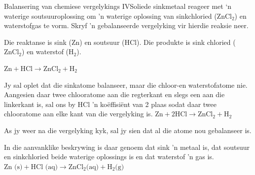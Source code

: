       \noindent
\begin{wex}{Balansering van chemiese vergelykings IV}{Soliede sinkmetaal reageer met ‘n waterige soutsuuroplossing om 'n waterige oplossing van  sinkchloried ($\text{ZnCl}_{2}$) en waterstofgas te vorm. Skryf 'n gebalanseerde vergelyking vir hierdie reaksie neer.}

{
Die reaktanse is sink ($\text{Zn}$) en soutsuur ($\text{HCl}$). Die produkte is sink chloried ($\text{ZnCl}_{2}$) en waterstof ($\text{H}_{2}$).\\
}

{
${\text{Zn} + \text{HCl} \rightarrow \text{ZnCl}_{2} + \text{H}_{2}}$
}

{
Jy sal oplet dat die sinkatome balanseer, maar die chloor-en waterstofatome nie. Aangesien daar twee chlooratome aan die regterkant en slegs een aan die linkerkant is, sal ons by HCl 'n ko\"{e}ffisiënt van 2 plaas sodat daar twee chlooratome aan elke kant van die  vergelyking is.
${\text{Zn} + 2\text{HCl} \rightarrow \text{ZnCl}_{2} + \text{H}_{2}}$
}

{
 As jy weer na die vergelyking kyk, sal jy sien dat al die atome nou gebalanseer is.
}

{
In die aanvanklike beskrywing is daar genoem dat sink 'n metaal is, dat soutsuur en sinkchloried beide waterige oplossings is  en dat waterstof 'n gas is.
$\text{Zn (s)} + \text{HCl (aq)} \rightarrow \text{ZnCl}_{2} \text{(aq)} + \text{H}_{2} \text{(g)}$
}
\end{wex}
    \noindent
\par


